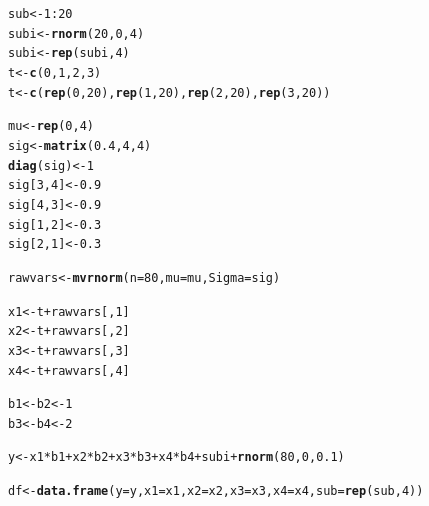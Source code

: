 \documentclass[11pt,a4paper,twoside]{book}\usepackage[]{graphicx}\usepackage[]{color}
\makeatletter
\newcommand{\hlnum}[1]{\textcolor[rgb]{0.686,0.059,0.569}{#1}}%
\newcommand{\hlopt}[1]{\textcolor[rgb]{0,0,0}{#1}}%
\newcommand{\hlstd}[1]{\textcolor[rgb]{0.345,0.345,0.345}{#1}}%
\newcommand{\hlkwb}[1]{\textcolor[rgb]{0.69,0.353,0.396}{#1}}%
\newcommand{\hlkwc}[1]{\textcolor[rgb]{0.333,0.667,0.333}{#1}}%
\newcommand{\hlkwd}[1]{\textcolor[rgb]{0.737,0.353,0.396}{\textbf{#1}}}%
\newenvironment{kframe}{%
 \def\at@end@of@kframe{}%
 \ifinner\ifhmode%
  \def\at@end@of@kframe{\end{minipage}}%
  \begin{minipage}{\columnwidth}%
 \fi\fi%
 \def\FrameCommand##1{\hskip\@totalleftmargin \hskip-\fboxsep
 \colorbox{shadecolor}{##1}\hskip-\fboxsep
     \hskip-\linewidth \hskip-\@totalleftmargin \hskip\columnwidth}%
 \MakeFramed {\advance\hsize-\width
   \@totalleftmargin\z@ \linewidth\hsize
   \@setminipage}}%
 {\par\unskip\endMakeFramed%
 \at@end@of@kframe}
\newenvironment{knitrout}{}{} %
\makeatother
\begin{document}
\begin{knitrout}
\color{fgcolor}\begin{kframe}
\begin{alltt}
\hlstd{sub}\hlkwb{<-} \hlnum{1}\hlopt{:}\hlnum{20}
\hlstd{subi} \hlkwb{<-} \hlkwd{rnorm}\hlstd{(}\hlnum{20}\hlstd{,} \hlnum{0}\hlstd{,} \hlnum{4}\hlstd{)}
\hlstd{subi}\hlkwb{<-}\hlkwd{rep}\hlstd{(subi,} \hlnum{4}\hlstd{)}
\hlstd{t} \hlkwb{<-} \hlkwd{c}\hlstd{(}\hlnum{0}\hlstd{,} \hlnum{1}\hlstd{,} \hlnum{2}\hlstd{,}\hlnum{3}\hlstd{)}
\hlstd{t} \hlkwb{<-} \hlkwd{c}\hlstd{(}\hlkwd{rep}\hlstd{(}\hlnum{0}\hlstd{,} \hlnum{20}\hlstd{),} \hlkwd{rep}\hlstd{(}\hlnum{1}\hlstd{,}\hlnum{20}\hlstd{),} \hlkwd{rep}\hlstd{(}\hlnum{2}\hlstd{,} \hlnum{20}\hlstd{),} \hlkwd{rep}\hlstd{(}\hlnum{3}\hlstd{,}\hlnum{20}\hlstd{))}

\hlstd{mu} \hlkwb{<-} \hlkwd{rep}\hlstd{(}\hlnum{0}\hlstd{,}\hlnum{4}\hlstd{)}
\hlstd{sig} \hlkwb{<-} \hlkwd{matrix}\hlstd{(}\hlnum{0.4}\hlstd{,} \hlnum{4}\hlstd{,} \hlnum{4}\hlstd{)}
\hlkwd{diag}\hlstd{(sig)} \hlkwb{<-} \hlnum{1}
\hlstd{sig[}\hlnum{3}\hlstd{,}\hlnum{4}\hlstd{]} \hlkwb{<-} \hlnum{0.9}
\hlstd{sig[}\hlnum{4}\hlstd{,}\hlnum{3}\hlstd{]} \hlkwb{<-} \hlnum{0.9}
\hlstd{sig[}\hlnum{1}\hlstd{,}\hlnum{2}\hlstd{]} \hlkwb{<-} \hlnum{0.3}
\hlstd{sig[}\hlnum{2}\hlstd{,}\hlnum{1}\hlstd{]} \hlkwb{<-} \hlnum{0.3}


\hlstd{rawvars} \hlkwb{<-} \hlkwd{mvrnorm}\hlstd{(}\hlkwc{n}\hlstd{=}\hlnum{80}\hlstd{,} \hlkwc{mu}\hlstd{=mu,} \hlkwc{Sigma}\hlstd{=sig)}

\hlstd{x1} \hlkwb{<-} \hlstd{t}\hlopt{+}\hlstd{rawvars[,}\hlnum{1}\hlstd{]}
\hlstd{x2} \hlkwb{<-} \hlstd{t}\hlopt{+}\hlstd{rawvars[,}\hlnum{2}\hlstd{]}
\hlstd{x3} \hlkwb{<-} \hlstd{t}\hlopt{+}\hlstd{rawvars[,}\hlnum{3}\hlstd{]}
\hlstd{x4} \hlkwb{<-} \hlstd{t}\hlopt{+}\hlstd{rawvars[,}\hlnum{4}\hlstd{]}

\hlstd{b1} \hlkwb{<-} \hlstd{b2}  \hlkwb{<-}\hlnum{1}
\hlstd{b3} \hlkwb{<-} \hlstd{b4} \hlkwb{<-} \hlnum{2}

\hlstd{y}\hlkwb{<-} \hlstd{x1}\hlopt{*}\hlstd{b1} \hlopt{+}\hlstd{x2}\hlopt{*}\hlstd{b2} \hlopt{+}\hlstd{x3}\hlopt{*}\hlstd{b3}\hlopt{+}  \hlstd{x4}\hlopt{*}\hlstd{b4} \hlopt{+} \hlstd{subi}\hlopt{+} \hlkwd{rnorm}\hlstd{(}\hlnum{80}\hlstd{,} \hlnum{0}\hlstd{,} \hlnum{0.1}\hlstd{)}

\hlstd{df} \hlkwb{<-} \hlkwd{data.frame}\hlstd{(}\hlkwc{y}\hlstd{=y,} \hlkwc{x1} \hlstd{= x1,} \hlkwc{x2}\hlstd{=x2,} \hlkwc{x3} \hlstd{= x3,} \hlkwc{x4} \hlstd{= x4,} \hlkwc{sub} \hlstd{=} \hlkwd{rep}\hlstd{(sub,}\hlnum{4}\hlstd{))}


\end{alltt}
\end{kframe}
\end{knitrout}
\end{document}
